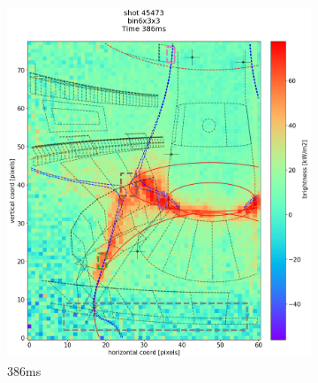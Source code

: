\begin{figure}
     \centering
     \begin{subfigure}{0.355\linewidth}
         \centering
         \includegraphics[trim={50 45 25 80},clip,width=\textwidth]{Chapters/chapter2/figs/IRVB-MASTU_shot-45473_export_34.png}
         \vspace*{-6.5mm}
         \caption{386ms}
         \label{fig:45473_export_1}
     \end{subfigure}
     \begin{subfigure}{0.355\linewidth}
         \centering

\end{subfigure}
\end{figure}
